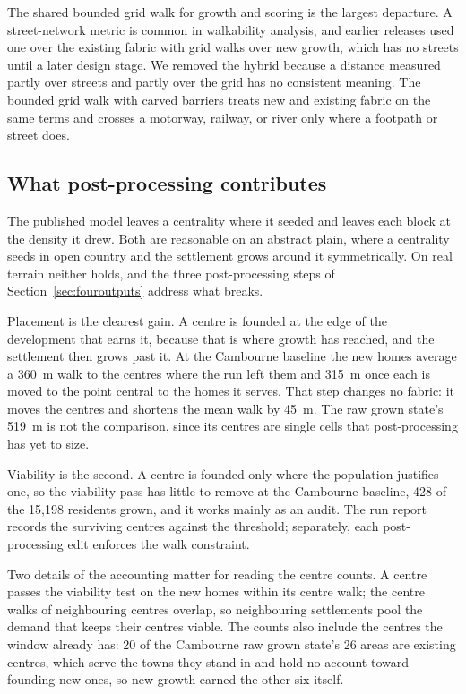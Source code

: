 \documentclass[11pt]{article}
\begin{document}
The shared bounded grid walk for growth and scoring is the largest
departure. A street-network metric is common in walkability
analysis, and earlier releases used one over the existing fabric
with grid walks over new growth, which has no streets until a later
design stage. We removed the hybrid because a distance measured
partly over streets and partly over the grid has no consistent
meaning. The bounded grid walk with carved barriers treats new and
existing fabric on the same terms and crosses a motorway, railway,
or river only where a footpath or street does.

\subsection{What post-processing contributes}

The published model leaves a centrality where it seeded and leaves each
block at the density it drew. Both are reasonable on an abstract plain,
where a centrality seeds in open country and the settlement grows around
it symmetrically. On real terrain neither holds, and the three
post-processing steps of Section~\ref{sec:fouroutputs} address what
breaks.

Placement is the clearest gain. A centre is founded at the edge of the
development that earns it, because that is where growth has reached,
and the settlement then grows past it. At the Cambourne baseline the new
homes average a 360~m walk to the centres where the run left them and
315~m once each is moved to the point central to the homes it serves.
That step changes no fabric: it moves the centres and shortens the mean
walk by 45~m. The raw grown state's 519~m is not the
comparison, since its centres are single cells that post-processing has
yet to size.

Viability is the second. A centre is founded only where the
population justifies one, so the viability pass has little to remove at
the Cambourne baseline, 428 of the 15{,}198 residents grown, and it
works mainly as an audit. The run report records the surviving
centres against the threshold; separately, each post-processing
edit enforces the walk constraint.

Two details of the accounting matter for reading the centre counts. A
centre passes the viability test on the new homes within its centre
walk; the centre walks of neighbouring centres overlap, so
neighbouring settlements pool the
demand that keeps their centres viable. The counts also include the
centres the window already has: 20 of the Cambourne raw grown
state's 26 areas are
existing centres, which serve the towns they stand in and hold no account
toward founding new ones, so new growth earned the other six itself.
\end{document}
